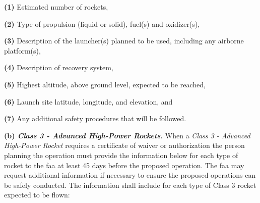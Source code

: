 \begin{adjustwidth}{0.5in}{0.0in}
\textbf{(1)} Estimated number of rockets,\par

\end{adjustwidth}

\begin{adjustwidth}{0.5in}{0.0in}
\textbf{(2)} Type of propulsion (liquid or solid), fuel(s) and oxidizer(s),\par

\end{adjustwidth}

\begin{adjustwidth}{0.5in}{0.0in}
\textbf{(3)} Description of the launcher(s) planned to be used, including any airborne platform(s),\par

\end{adjustwidth}

\begin{adjustwidth}{0.5in}{0.0in}
\textbf{(4)} Description of recovery system,\par

\end{adjustwidth}

\begin{adjustwidth}{0.5in}{0.0in}
\textbf{(5)} Highest altitude, above ground level, expected to be reached,\par

\end{adjustwidth}

\begin{adjustwidth}{0.5in}{0.0in}
\textbf{(6)} Launch site latitude, longitude, and elevation, and\par

\end{adjustwidth}

\begin{adjustwidth}{0.5in}{0.0in}
\textbf{(7)} Any additional safety procedures that will be followed.\par

\end{adjustwidth}

\textbf{(b)\textit{ Class 3 - Advanced High-Power Rockets.}} When a \textit{Class 3 - Advanced High-Power Rocket} requires a certificate of waiver or authorization the person planning the operation must provide the information below for each type of rocket to the \gls{faa} at least 45 days before the proposed operation. The \gls{faa} may request additional information if necessary to ensure the proposed operations can be safely conducted. The information shall include for each type of Class 3 rocket expected to be flown:\par

